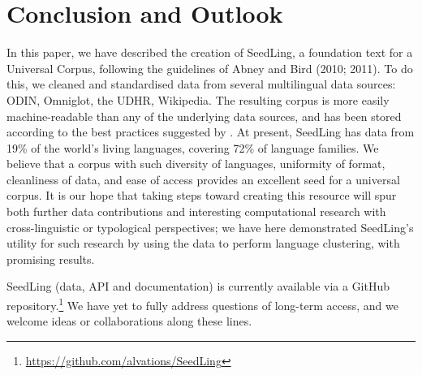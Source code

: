 \section{Conclusion and Outlook} \label{sec:conclusion}

In this paper, we have described the creation of SeedLing, a foundation text for a Universal Corpus, following the guidelines of Abney and Bird (2010; 2011). To do this, we cleaned and standardised data from several multilingual data sources: ODIN, Omniglot, the UDHR, Wikipedia. The resulting corpus is more easily machine-readable than any of the underlying data sources, and has been stored according to the best practices suggested by . At present, SeedLing has data from 19\% of the world's living languages, covering 72\% of language families. We believe that a corpus with such diversity of languages, uniformity of format, cleanliness of data, and ease of access provides an excellent seed for a universal corpus. It is our hope that taking steps toward creating this resource will spur both further data contributions and interesting computational research with cross-linguistic or typological perspectives; we have here demonstrated SeedLing's utility for such research by using the data to perform language clustering, with promising results.

SeedLing (data, API and documentation) is currently available via a GitHub repository.\footnote{\url{https://github.com/alvations/SeedLing}} We have yet to fully address questions of long-term access, and we welcome ideas or collaborations along these lines.
